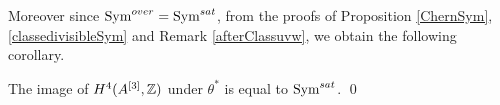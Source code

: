 Moreover since $\operatorname{Sym}^{over}=\operatorname{Sym}^{sat}$, from the proofs of Proposition \ref{ChernSym}, \ref{classedivisibleSym} and Remark \ref{afterClassuvw}, we obtain the following corollary.
\begin{corollary}\label{SymSatImage}
The image of $H^4(A^{[3]},\mathbb{Z})$ under $\theta^*$ is equal to $\operatorname{Sym}^{sat}$. \qed
\end{corollary}